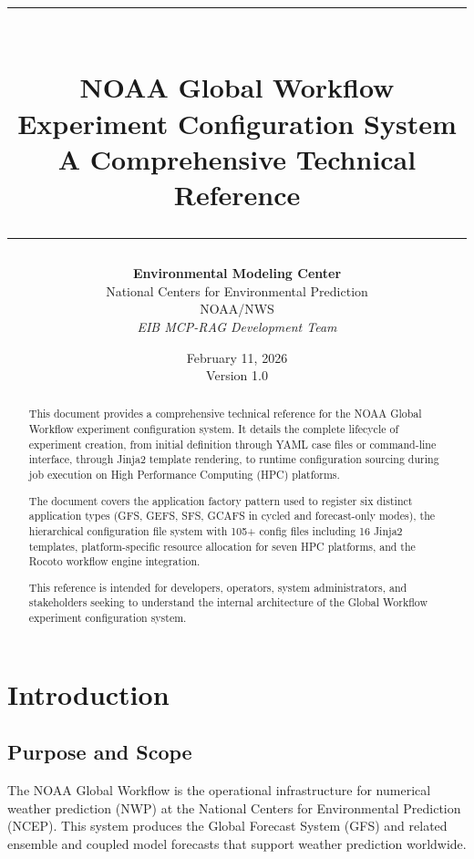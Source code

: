 \documentclass[11pt,letterpaper]{article}
\title{
    \vspace{-1cm}
    {\color{NOAABlue}\rule{\linewidth}{2pt}}\\[0.4cm]
    {\Huge\bfseries\color{NOAABlue} NOAA Global Workflow\\[0.3cm]
    Experiment Configuration System}\\[0.3cm]
    {\Large A Comprehensive Technical Reference}\\[0.2cm]
    {\color{NOAABlue}\rule{\linewidth}{2pt}}
}
\author{
    \textbf{Environmental Modeling Center}\\
    National Centers for Environmental Prediction\\
    NOAA/NWS\\[0.3cm]
    \textit{EIB MCP-RAG Development Team}
}
\date{February 11, 2026\\Version 1.0}
\begin{document}
\maketitle
\thispagestyle{empty}


\begin{abstract}
\noindent
This document provides a comprehensive technical reference for the NOAA Global Workflow experiment configuration system. It details the complete lifecycle of experiment creation, from initial definition through YAML case files or command-line interface, through Jinja2 template rendering, to runtime configuration sourcing during job execution on High Performance Computing (HPC) platforms.

The document covers the application factory pattern used to register six distinct application types (GFS, GEFS, SFS, GCAFS in cycled and forecast-only modes), the hierarchical configuration file system with 105+ config files including 16 Jinja2 templates, platform-specific resource allocation for seven HPC platforms, and the Rocoto workflow engine integration.

This reference is intended for developers, operators, system administrators, and stakeholders seeking to understand the internal architecture of the Global Workflow experiment configuration system.
\end{abstract}

\newpage
\tableofcontents
\newpage


\section{Introduction}

\subsection{Purpose and Scope}

The NOAA Global Workflow is the operational infrastructure for numerical weather prediction (NWP) at the National Centers for Environmental Prediction (NCEP). This system produces the Global Forecast System (GFS) and related ensemble and coupled model forecasts that support weather prediction worldwide.
\end{document}

